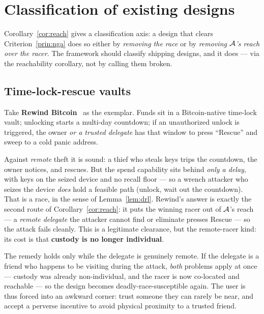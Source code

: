 \section{Classification of existing designs}
\label{sec:classify}

Corollary~\ref{cor:reach} gives a classification axis: a design that clears
Criterion~\ref{prin:nga} does so either by \emph{removing the race} or by
\emph{removing $\mathcal{A}$'s reach over the racer}. The framework should
classify shipping designs, and it does --- via the reachability corollary, not
by calling them broken.

\subsection{Time-lock-rescue vaults}

Take \textbf{Rewind Bitcoin}~\cite{rewind-bitcoin} as the exemplar. Funds sit in
a Bitcoin-native time-lock vault; unlocking starts a multi-day countdown; if an
unauthorized unlock is triggered, the owner \emph{or a trusted delegate} has that
window to press ``Rescue'' and sweep to a cold panic address.

Against \emph{remote} theft it is sound: a thief who steals keys trips the
countdown, the owner notices, and rescues. But the spend capability sits behind
\emph{only a delay}, with keys on the seized device and no recall floor --- so a
wrench attacker who seizes the device \emph{does} hold a feasible path (unlock,
wait out the countdown). That is a race, in the sense of Lemma~\ref{lem:drl}.
Rewind's answer is exactly the second route of Corollary~\ref{cor:reach}: it puts
the winning racer out of $\mathcal{A}$'s reach --- a \emph{remote delegate} the
attacker cannot find or eliminate presses Rescue --- so the attack fails
cleanly. This is a legitimate clearance, but the remote-racer kind: its cost is
that \textbf{custody is no longer individual}.

\begin{remark}\label{rem:escape-closes}
The remedy holds only while the delegate is genuinely remote. If the delegate is
a friend who happens to be visiting during the attack, \emph{both} problems
apply at once --- custody was already non-individual, and the racer is now
co-located and reachable --- so the design becomes deadly-race-susceptible
again. The user is thus forced into an awkward corner: trust someone they can
rarely be near, and accept a perverse incentive to avoid physical proximity to a
trusted friend.
\end{remark}


